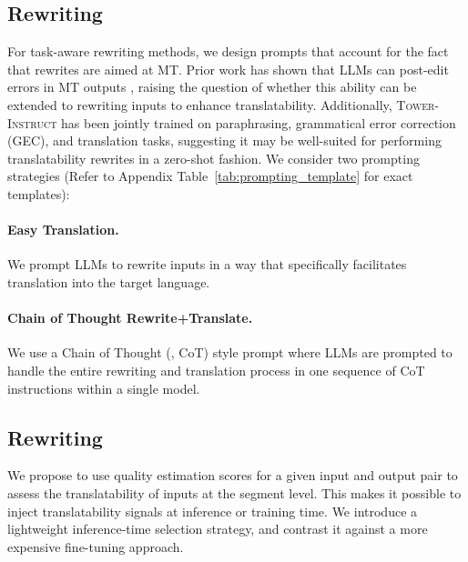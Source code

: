 \subsection{ Rewriting}
\label{3.2 task-aware}

For task-aware rewriting methods, we design prompts that account for the fact that rewrites are aimed at MT. 
Prior work has shown that LLMs can post-edit errors in MT outputs \citep{ki2024guiding, zeng2024improving, treviso-etal-2024-xtower, xu2024llmrefine, briakou-etal-2024-translating}, raising the question of whether this ability can be extended to rewriting inputs to enhance translatability. Additionally, \textsc{Tower-Instruct} has been jointly trained on paraphrasing, grammatical error correction (GEC), and translation tasks, suggesting it may be well-suited for performing translatability rewrites in a zero-shot fashion. We consider two prompting strategies (Refer to Appendix Table~\ref{tab:prompting_template} for exact templates):

\paragraph{Easy Translation.} We prompt LLMs to rewrite inputs in a way that specifically facilitates translation into the target language.

\paragraph{Chain of Thought Rewrite+Translate.} We use a Chain of Thought (\citet{wei2023chainofthought}, CoT) style prompt where LLMs are prompted to handle the entire rewriting and translation process in one sequence of CoT instructions within a single model.



\subsection{ Rewriting}
\label{3.3 translatability-aware}
We propose to use quality estimation scores for a given input and output pair to assess the translatability of inputs at the segment level. This makes it possible to inject translatability signals at inference or training time. We introduce a lightweight inference-time selection strategy, and contrast it against a more expensive fine-tuning approach.


